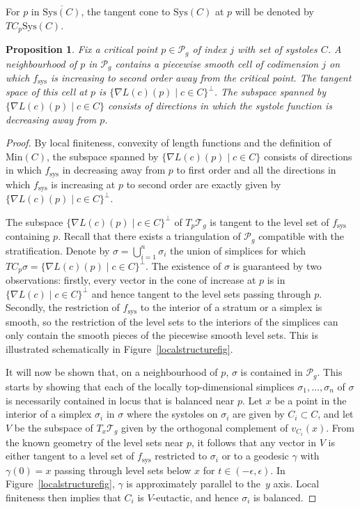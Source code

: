 \documentclass[pdftex]{sigma}
\numberwithin{equation}{section}
\newtheorem{Proposition}[Theorem]{Proposition}
\begin{document}
For $p$ in $\overline{\mathrm{Sys}(C)}$, the tangent cone to $\mathrm{Sys}(C)$ at $p$ will be denoted by $TC_{p}\mathrm{Sys}(C)$.

\begin{Proposition}
\label{localstructure}
Fix a critical point $p\in \mathcal{P}_{g}$ of index $j$ with set of systoles $C$. A neighbourhood of $p$ in $\mathcal{P}_{g}$ contains a piecewise smooth cell of codimension $j$ on which $f_{\mathrm{sys}}$ is increasing to second order away from the critical point. The tangent space of this cell at $p$ is $\{\nabla L(c)(p) \mid c\in C\}^{\perp}$. The subspace spanned by $\{\nabla L(c)(p) \mid c\in C\}$ consists of directions in which the systole function is decreasing away from $p$.
\end{Proposition}

\begin{proof}
By local finiteness, convexity of length functions and the definition of $\mathrm{Min}(C)$, the subspace spanned by $\{\nabla L(c)(p) \mid c\in C\}$ consists of directions in which $f_{\mathrm{sys}}$ in decreasing away from $p$ to first order and all the directions in which $f_{\mathrm{sys}}$ is increasing at $p$ to second order are exactly given by $\{\nabla L(c)(p) \mid c\in C\}^{\perp}$.

The subspace $\{\nabla L(c)(p) \mid c\in C\}^{\perp}$ of $T_{p}\mathcal{T}_{g}$ is tangent to the level set of $f_{\mathrm{sys}}$ containing $p$. Recall that there exists a triangulation of $\mathcal{P}_{g}$ compatible with the stratification. Denote by $\sigma=\bigcup_{i=1}^{n}\sigma_{i}$ the union of simplices for which $TC_{p}\sigma=\{\nabla L(c)(p) \mid c\in C\}^{\perp}$. The existence of $\sigma$ is guaranteed by two observations: firstly, every vector in the cone of increase at $p$ is in $\{\nabla L(c) \mid c\in C\}^{\perp}$ and hence tangent to the level sets passing through $p$. Secondly, the restriction of $f_{\mathrm{sys}}$ to the interior of a stratum or a simplex is smooth, so the restriction of the level sets to the interiors of the simplices can only contain the smooth pieces of the piecewise smooth level sets. This is illustrated schematically in Figure~\ref{localstructurefig}.

It will now be shown that, on a neighbourhood of $p$, $\sigma$ is contained in $\mathcal{P}_{g}$. This starts by showing that each of the locally top-dimensional simplices $\sigma_{1}, \dots, \sigma_{n}$ of $\sigma$ is necessarily contained in locus that is balanced near $p$. Let $x$ be a point in the interior of a simplex $\sigma_{i}$ in $\sigma$ where the systoles on $\sigma_{i}$ are given by $C_{i}\subset C$, and let $V$ be the subspace of $T_{x}\mathcal{T}_{g}$ given by the orthogonal complement of $v_{C_{i}}(x)$. From the known geometry of the level sets near $p$, it follows that any vector in $V$ is either tangent to a level set of $f_{\mathrm{sys}}$ restricted to $\sigma_{i}$ or to a geodesic $\gamma$ with $\gamma(0)=x$ passing through level sets below $x$ for $t\in (-\epsilon,\epsilon)$. In Figure~\ref{localstructurefig}, $\gamma$ is approximately parallel to the~$y$ axis. Local finiteness then implies that $C_{i}$ is $V$-eutactic, and hence $\sigma_{i}$ is balanced.


\end{proof}
\end{document}

